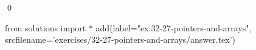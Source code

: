 
\begin{ex}
  \label{ex:32-27-pointers-and-arrays}
  
  \qed
\end{ex}
\begin{python0}
from solutions import *
add(label="ex:32-27-pointers-and-arrays",
    srcfilename='exercises/32-27-pointers-and-arrays/answer.tex')
\end{python0}
